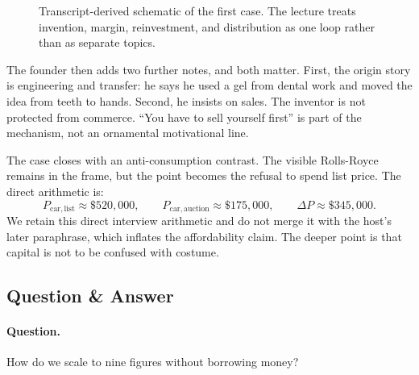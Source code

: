 \begin{figure}
\centering
{}
\caption{Transcript-derived schematic of the first case. The lecture treats invention, margin, reinvestment, and distribution as one loop rather than as separate topics.}
\end{figure}

The founder then adds two further notes, and both matter. First, the origin story is engineering and transfer: he says he used a gel from dental work and moved the idea from teeth to hands. Second, he insists on sales. The inventor is not protected from commerce. ``You have to sell yourself first'' is part of the mechanism, not an ornamental motivational line.

The case closes with an anti-consumption contrast. The visible Rolls-Royce remains in the frame, but the point becomes the refusal to spend list price. The direct arithmetic is:
\begin{equation}
P_{\mathrm{car,list}} \approx \$520{,}000, \qquad
P_{\mathrm{car,auction}} \approx \$175{,}000, \qquad
\Delta P \approx \$345{,}000.
\end{equation}
We retain this direct interview arithmetic and do not merge it with the host's later paraphrase, which inflates the affordability claim. The deeper point is that capital is not to be confused with costume.

\subsection{Question \& Answer}

\paragraph{Question.} How do we scale to nine figures without borrowing money?

